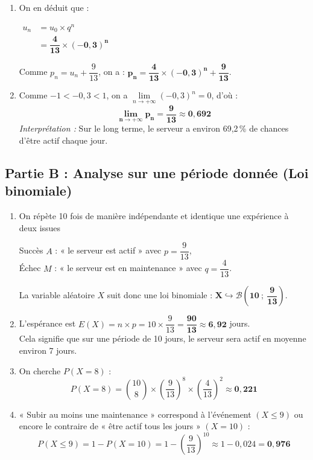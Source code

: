 \documentclass[12pt,a4paper]{article}
\begin{document}
\begin{enumerate}
\begin{enumerate}
        \begin{align*}
        u_0 &= p_0 - \dfrac{9}{13}\\
            &= 1 - \dfrac{9}{13} \\
            &= \mathbf{\dfrac{4}{13}}
        \end{align*}
        
        \item On en déduit que : 
        
        $\begin{aligned}
        u_n &= u_0 \times q^n \\
            &= \mathbf{\dfrac{4}{13} \times (-0,3)^n}
        \end{aligned}$
        
        Comme $p_n = u_n + \dfrac{9}{13}$, on a : $\mathbf{p_n = \dfrac{4}{13} \times (-0,3)^n + \dfrac{9}{13}}$.
        
        \item Comme $-1 < -0,3 < 1$, on a $\lim\limits_{n \to +\infty} (-0,3)^n = 0$, d'où :
        \[ \mathbf{\lim_{n \to +\infty} p_n = \dfrac{9}{13} \approx 0,692} \]
        \textit{Interprétation :} Sur le long terme, le serveur a environ 69,2\,\% de chances d'être actif chaque jour.
    \end{enumerate}
\end{enumerate}

\subsection*{Partie B : Analyse sur une période donnée (Loi binomiale)}
\begin{enumerate}
    \item On répète 10 fois de manière indépendante et identique une expérience à deux issues 
    
    Succès $A$ : « le serveur est actif » avec $p = \dfrac{9}{13}$,\\ Échec $M$ : « le serveur est en maintenance » avec $q = \dfrac{4}{13}$.
    
    La variable aléatoire $X$ suit donc une loi binomiale : $\mathbf{X \hookrightarrow \mathcal{B}\left(10 \ ; \ \dfrac{9}{13}\right)}$.
    
    \item L'espérance est $E(X) = n \times p = 10 \times \dfrac{9}{13} = \mathbf{\dfrac{90}{13} \approx 6,92}$ jours.\\
    Cela signifie que sur une période de 10 jours, le serveur sera actif en moyenne environ 7 jours.
    
    \item On cherche $P(X = 8)$ :
    \[ P(X = 8) = \binom{10}{8} \times \left(\dfrac{9}{13}\right)^8 \times \left(\dfrac{4}{13}\right)^2 \approx \mathbf{0,221} \]
    
    \item « Subir au moins une maintenance » correspond à l'événement $(X \le 9)$ ou encore le contraire de « être actif tous les jours » $(X = 10)$ :
    \[ P(X \le 9) = 1 - P(X = 10) = 1 - \left(\dfrac{9}{13}\right)^{10} \approx 1 - 0,024 = \mathbf{0,976} \]
\end{enumerate}
\end{document}
